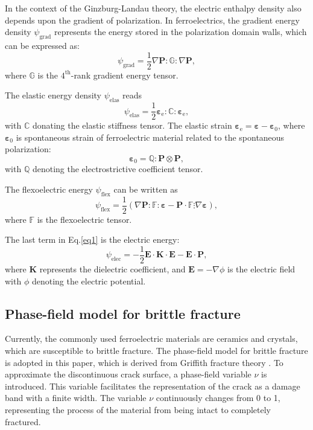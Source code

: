In the context of the Ginzburg-Landau theory, the electric enthalpy density also depends upon the gradient of polarization. In ferroelectrics, the gradient energy density $\psi_\mathrm{grad}$ represents the energy stored in the polarization domain walls, which can be expressed as:
\begin{equation}
    \psi_\mathrm{grad}=\frac{1}{2}\nabla\mathbf{P}:\mathbb{G}:\nabla \mathbf{P},
\end{equation}
where $\mathbb{G}$ is the $4^\mathrm{th}$-rank gradient energy tensor. 

The elastic energy density $\psi_\mathrm{elas}$ reads
\begin{equation}\label{f_elas}
    \psi_\mathrm{elas}=\frac{1}{2}\mathbf{\varepsilon}_\mathrm{e}:\mathbb{C}:\mathbf{\varepsilon}_\mathrm{e},
\end{equation}
with $\mathbb{C}$ donating the elastic stiffness tensor. The elastic strain $\mathbf{\varepsilon}_\mathrm{e}=\mathbf{\varepsilon}-\mathbf{\varepsilon}_0$, where $\mathbf{\varepsilon}_0$ is spontaneous strain of ferroelectric material related to the spontaneous polarization:
\begin{equation}\label{eq5}
    \mathbf{\varepsilon}_0=\mathbb{Q}:\mathbf{P}\otimes\mathbf{P},
\end{equation}
with $\mathbb{Q}$ denoting the electrostrictive coefficient tensor.

The flexoelectric energy $\psi_\mathrm{flex}$ can be written as 
\begin{equation}
    \psi_\mathrm{flex}=\frac{1}{2}(\nabla \mathbf{P}: \mathbb{F}: \mathbf{\varepsilon}-\mathbf{P}\cdot\mathbb{F}\vdots\nabla\mathbf{\varepsilon}),
\end{equation}
where $\mathbb{F}$ is the flexoelectric tensor. 

The last term in Eq.\eqref{eq1} is the electric energy:
\begin{equation}
    \psi_\mathrm{elec}=-\frac{1}{2}\mathbf{E}\cdot \mathbf{K} \cdot \mathbf{E}-\mathbf{E}\cdot\mathbf{P},
\end{equation} 
where $\mathbf{K}$ represents the dielectric coefficient, and $\mathbf{E}=-\nabla \phi$ is the electric field with $\phi$ denoting the electric potential.

\subsection{Phase-field model for brittle fracture}
Currently, the commonly used ferroelectric materials are ceramics and crystals, which are susceptible to brittle fracture. The phase-field model for brittle fracture is adopted in this paper, which is derived from Griffith fracture theory \cite{francfort_revisiting_1998, bourdin_numerical_2000}. To approximate the discontinuous crack surface, a phase-field variable $\nu$ is introduced. This variable facilitates the representation of the crack as a damage band with a finite width. The variable $\nu$ continuously changes from 0 to 1, representing the process of the material from being intact to completely fractured. 

